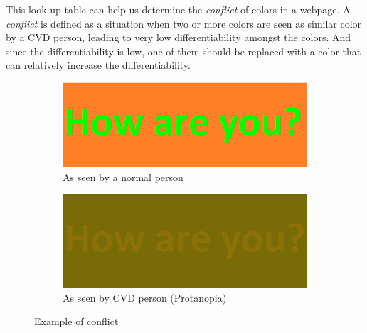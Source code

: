 {\vspace{10mm}}
\label{Tick}

This look up table can help us determine the \textit{conflict} of colors in a webpage. A \textit{conflict} is defined as a situation when two or more colors are seen as similar color by a CVD person, leading to very low differentiability amongst the colors. And since the differentiability is low, one of them should be replaced with a color that can relatively increase the differentiability.

\begin{figure}[!htb]
\centering
\begin{subfigure}{.5\textwidth}
  \centering
  \includegraphics[width=.5\linewidth]{hru1.png}
  \caption{As seen by a normal person}
  \label{fig:sub1}
\end{subfigure}%
\begin{subfigure}{.5\textwidth}
  \centering
  \includegraphics[width=.5\linewidth]{hru2.png}
  \caption{As seen by CVD person (Protanopia)}
  \label{fig:sub2}
\end{subfigure}
\caption{Example of conflict}
\label{fig:test}
\end{figure}

